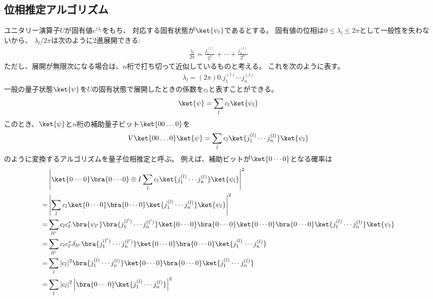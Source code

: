 \documentclass[]{ltjsarticle}
\begin{document}
\subsection{位相推定アルゴリズム}
ユニタリー演算子$U$が固有値$e^{i\lambda_l}$をもち、
対応する固有状態が$\ket{\psi_l}$であるとする。
固有値の位相は$0 \leq \lambda_l \leq 2\pi$として一般性を失わないから、
$\lambda_l/2\pi$は次のように2進展開できる:
\begin{align}
    \frac{\lambda_l}{2\pi}
    =
    \frac{j_1^{(l)}}{2^1} + \cdots + \frac{j_n^{(l)}}{2^n}
\end{align}
ただし、展開が無限次になる場合は、$n$桁で打ち切って近似しているものと考える。
これを次のように表す。
\begin{align}
    \lambda_l = (2\pi) 0.j_1^{(l)}\cdots j_n^{(l)}
\end{align}
一般の量子状態$\ket{\psi}$を$U$の固有状態で展開したときの係数を$c_l$と表すことができる。
\begin{align}
    \ket{\psi} = \sum_l c_l \ket{\psi_l}
\end{align}
このとき、$\ket{\psi}$と$n$桁の補助量子ビット$\ket{00\dots 0}$を
\begin{align}
    V\ket{00\dots 0}\ket{\psi}
    =
    \sum_l c_l \ket{j_1^{(l)}\cdots j_n^{(l)}} \ket{\psi_l}
\end{align}
のように変換するアルゴリズムを量子位相推定と呼ぶ。
例えば、補助ビットが$\ket{0\cdots 0}$となる確率は
\begin{align}
    &\left|
        \ket{0\cdots 0}\bra{0\cdots 0} \otimes I 
        \sum_l c_l \ket{j_1^{(l)}\cdots j_n^{(l)}} \ket{\psi_l}
    \right|^2 \\
    =
    &\left|
        \sum_l c_l 
        \ket{0\cdots 0}\bra{0\cdots 0}\ket{j_1^{(l)}\cdots j_n^{(l)}} 
        \ket{\psi_l}
    \right|^2 \\
    =
    &\sum_{ll'} c_l c_{l'}^* 
    \bra{\psi_{l'}}
    \bra{j_1^{(l')}\cdots j_n^{(l')}}\ket{0\cdots 0}
    \bra{0\cdots 0}
    \ket{0\cdots 0}
    \bra{0\cdots 0} \ket{j_1^{(l)}\cdots j_n^{(l)}} 
    \ket{\psi_l} \\
    =
    &\sum_{ll'} c_l c_{l'}^* \delta_{ll'}
    \bra{j_1^{(l')}\cdots j_n^{(l')}}\ket{0\cdots 0}
    \bra{0\cdots 0} \ket{j_1^{(l)}\cdots j_n^{(l)}} \\ 
    =
    &\sum_{l} |c_l|^2 
    \bra{j_1^{(l)}\cdots j_n^{(l)}}\ket{0\cdots 0}
    \bra{0\cdots 0} \ket{j_1^{(l)}\cdots j_n^{(l)}} \\
    =
    &\sum_{l} |c_l|^2 
    \left| \bra{0\cdots 0} \ket{j_1^{(l)}\cdots j_n^{(l)}} \right|^2
\end{align}
\end{document}

